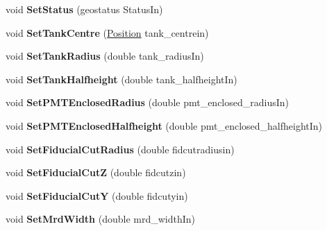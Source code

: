 \begin{DoxyCompactItemize}
\item 
\hypertarget{classGeometry_a2ecdbc2a94b827fa0c372da34138d77f}{void {\bfseries Set\-Status} (geostatus Status\-In)}\label{classGeometry_a2ecdbc2a94b827fa0c372da34138d77f}

\item 
\hypertarget{classGeometry_ac333cb9fd34843161769b5eaf084219f}{void {\bfseries Set\-Tank\-Centre} (\hyperlink{classPosition}{Position} tank\-\_\-centrein)}\label{classGeometry_ac333cb9fd34843161769b5eaf084219f}

\item 
\hypertarget{classGeometry_a0f2d050fa42af21e6e0b4914974b45f5}{void {\bfseries Set\-Tank\-Radius} (double tank\-\_\-radius\-In)}\label{classGeometry_a0f2d050fa42af21e6e0b4914974b45f5}

\item 
\hypertarget{classGeometry_aae1817255945967705d105665b2fb248}{void {\bfseries Set\-Tank\-Halfheight} (double tank\-\_\-halfheight\-In)}\label{classGeometry_aae1817255945967705d105665b2fb248}

\item 
\hypertarget{classGeometry_a220d86cc649f42a16d33c73c1fc9e70e}{void {\bfseries Set\-P\-M\-T\-Enclosed\-Radius} (double pmt\-\_\-enclosed\-\_\-radius\-In)}\label{classGeometry_a220d86cc649f42a16d33c73c1fc9e70e}

\item 
\hypertarget{classGeometry_aca093a4eaad96fa51b4bac6fbe5fc5b6}{void {\bfseries Set\-P\-M\-T\-Enclosed\-Halfheight} (double pmt\-\_\-enclosed\-\_\-halfheight\-In)}\label{classGeometry_aca093a4eaad96fa51b4bac6fbe5fc5b6}

\item 
\hypertarget{classGeometry_a88cbe634b7185c5230f925a182599dd1}{void {\bfseries Set\-Fiducial\-Cut\-Radius} (double fidcutradiusin)}\label{classGeometry_a88cbe634b7185c5230f925a182599dd1}

\item 
\hypertarget{classGeometry_acddde32956d96095d3deb2d00c90a3ee}{void {\bfseries Set\-Fiducial\-Cut\-Z} (double fidcutzin)}\label{classGeometry_acddde32956d96095d3deb2d00c90a3ee}

\item 
\hypertarget{classGeometry_a808167f759b49e7958abe1598d6b6294}{void {\bfseries Set\-Fiducial\-Cut\-Y} (double fidcutyin)}\label{classGeometry_a808167f759b49e7958abe1598d6b6294}

\item 
\hypertarget{classGeometry_a120524e0dcd97fdea137b49b976a5183}{void {\bfseries Set\-Mrd\-Width} (double mrd\-\_\-width\-In)}\label{classGeometry_a120524e0dcd97fdea137b49b976a5183}


\end{DoxyCompactItemize}
